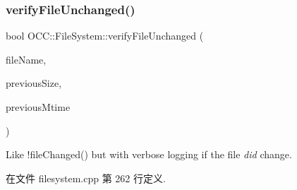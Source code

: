 \mbox{\label{namespace_o_c_c_1_1_file_system_a9301722279d55a31f6e6df8a534b06ec}} 
\subsubsection{\texorpdfstring{verify\+File\+Unchanged()}{verifyFileUnchanged()}}
{\footnotesize\ttfamily bool O\+C\+C\+::\+File\+System\+::verify\+File\+Unchanged (\begin{DoxyParamCaption}\item[{const Q\+String \&}]{file\+Name,  }\item[{qint64}]{previous\+Size,  }\item[{time\+\_\+t}]{previous\+Mtime }\end{DoxyParamCaption})}



Like !file\+Changed() but with verbose logging if the file {\itshape did} change. 



在文件 filesystem.\+cpp 第 262 行定义.

